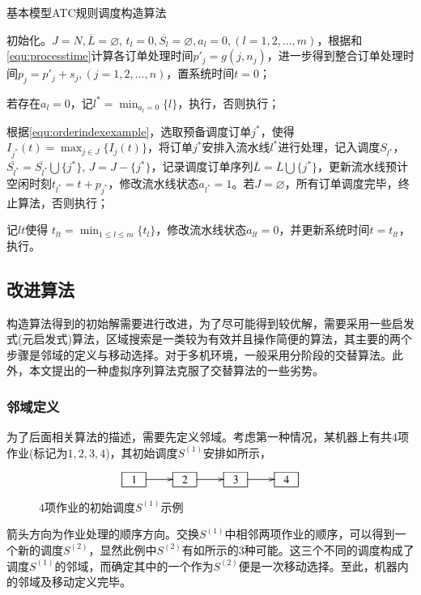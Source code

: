\begin{algori}
基本模型ATC规则调度构造算法\label{alg:basicconstruct}

\begin{asparaenum}
\renewcommand{\labelenumi}{\bf Step\theenumi~}
\item 初始化。$J = N, \overline{L} = \varnothing$, $t_l = 0, \overline{S_l} = \varnothing, a_l=0, (l = 1,2,...,m)$，根据和\eqref{equ:processtime}计算各订单处理时间$p'_j = g(j, n_j)$，进一步得到整合订单处理时间$p_j = p'_j + s_j, (j = 1,2,...,n)$，置系统时间$t = 0$；
\item 若存在$a_l = 0$，记$l^* = \displaystyle\min_{a_l = 0}\{l\}$，执行，否则执行；
\item 根据\eqref{equ:orderindexexample}，选取预备调度订单$j^*$，使得$I_{j^*}(t) = \displaystyle\max_{j\in J}\{I_j(t)\}$，将订单$j^*$安排入流水线$l^*$进行处理，记入调度$S_{l^*}$，$\overline{S_{l^*}}=\overline{S_{l^*}}\bigcup \{j^*\}$, $J = J -\{j^*\}$，记录调度订单序列$\overline{L} = \overline{L} \bigcup \{j^*\}$，更新流水线预计空闲时刻$t_{l^*} = t + p_{j^*}$，修改流水线状态$a_{l^*} = 1$。若$J = \varnothing$，所有订单调度完毕，终止算法，否则执行；
\item 记$lt$使得 $t_{lt} = \displaystyle\min_{1\le l\le m}\{t_l\}$，修改流水线状态$a_{lt} = 0$，并更新系统时间$t = t_{lt}$，执行。
\end{asparaenum}
\end{algori}

\subsection{改进算法}
构造算法得到的初始解需要进行改进，为了尽可能得到较优解，需要采用一些启发式(元启发式)算法，区域搜索是一类较为有效并且操作简便的算法，其主要的两个步骤是邻域的定义与移动选择。对于多机环境，一般采用分阶段的交替算法。此外，本文提出的一种虚拟序列算法克服了交替算法的一些劣势。

\subsubsection{邻域定义}
为了后面相关算法的描述，需要先定义邻域。考虑第一种情况，某机器上有共$4$项作业(标记为$1,2,3,4$)，其初始调度$S^{(1)}$安排如所示，
\begin{figure}[h]
\begin{equation*}
\xymatrix{
\jobunit{1} \ar[r] & \jobunit{2} \ar[r] &\jobunit{3} \ar[r] &\jobunit{4}
}
\end{equation*}
\caption{$4$项作业的初始调度$S^{(1)}$示例\label{fig:4example}}
\end{figure}
箭头方向为作业处理的顺序方向。交换$S^{(1)}$中相邻两项作业的顺序，可以得到一个新的调度$S^{(2)}$，显然此例中$S^{(2)}$有如所示的$3$种可能。这三个不同的调度构成了调度$S^{(1)}$的邻域，而确定其中的一个作为$S^{(2)}$便是一次移动选择。至此，机器内的邻域及移动定义完毕。

